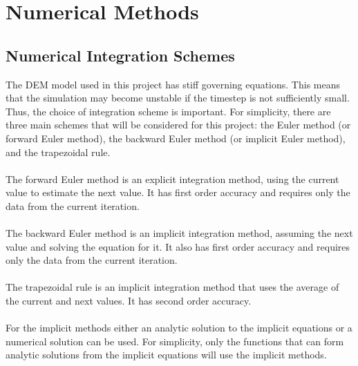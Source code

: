 \documentclass[10pt,a4paper,titlepage]{report}
\begin{document}
\chapter{Numerical Methods}
\label{ch:Numerical Methods}
\section{Numerical Integration Schemes}
The DEM model used in this project has stiff governing equations. This means that the simulation may become unstable if the timestep is not sufficiently small. Thus, the choice of integration scheme is important. For simplicity, there are three main schemes that will be considered for this project: the Euler method (or forward Euler method), the backward Euler method (or implicit Euler method), and the trapezoidal rule.
\\\\The forward Euler method is an explicit integration method, using the current value to estimate the next value. It has first order accuracy and requires only the data from the current iteration.
\\\\The backward Euler method is an implicit integration method, assuming the next value and solving the equation for it. It also has first order accuracy and requires only the data from the current iteration.
\\\\The trapezoidal rule is an implicit integration method that uses the average of the current and next values. It has second order accuracy.
\\\\For the implicit methods either an analytic solution to the implicit equations or a numerical solution can be used. For simplicity, only the functions that can form analytic solutions from the implicit equations will use the implicit methods.
\end{document}
